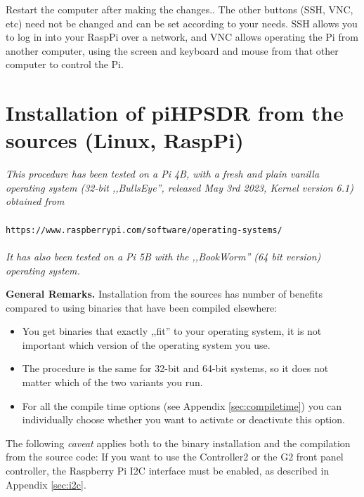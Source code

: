 \documentclass[12pt]{book}
\def\pH{pi\-HPSDR\xspace}
\begin{document}
Restart the computer after making the changes..
The other buttons (SSH, VNC, etc) need not be changed and can be set according to your needs. SSH allows
you to log in into your RaspPi over a network, and VNC allows operating the Pi from another computer,
using the screen and keyboard and mouse from that other computer to control the Pi.

\chapter[Linux: \pH install from sources]{Installation of \pH from the sources (Linux, RaspPi)}
\label{sec:installsources}
\textit{This procedure has been tested on a Pi 4B, with a fresh and plain vanilla operating
system (32-bit ,,BullsEye'', released May 3rd 2023, Kernel version 6.1) obtained from} \\
\\
\texttt{https://www.raspberrypi.com/software/operating-systems/} \\
\\
\textit{It has also been tested on a Pi 5B with the ,,BookWorm'' (64 bit version) operating system.}

\textbf{General Remarks.}
Installation from the sources has number of benefits compared to using binaries that have
been compiled elsewhere:

\begin{itemize}
\item{You get binaries that exactly ,,fit'' to your operating system, it is not important which version
of the operating system you use.}
\item{The procedure is the same for 32-bit and 64-bit systems, so it does not matter
which of the two variants you run.}
\item{For all the compile time options (see Appendix \ref{sec:compiletime}) you can individually choose
whether you want to activate or deactivate this option.}
\end{itemize}

The following \textit{caveat} applies both to the binary installation and the compilation from
the source code: If you want to use the Controller2 or the G2 front panel controller,
 the Raspberry Pi I2C interface
must be enabled, as described in Appendix \ref{sec:i2c}.
\end{document}
